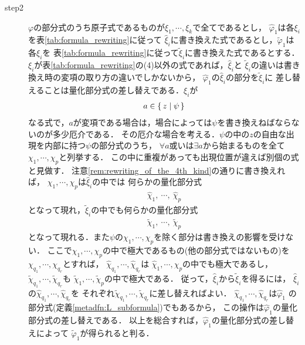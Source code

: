 \begin{sketch}
\begin{description}
			\item[step2]	
				$\varphi$の部分式のうち原子式であるものが$\xi_{1},\cdots,\xi_{k}$で全てであるとし，
				$\widehat{\varphi}_{1}$は各$\xi_{i}$を表\ref{tab:formula_rewriting}に従って
				$\widehat{\xi}_{i}$に書き換えた式であるとし，$\widetilde{\varphi}_{1}$は各$\xi_{i}$を
				表\ref{tab:formula_rewriting}に従って$\widetilde{\xi}_{i}$に書き換えた式であるとする．
				$\xi_{i}$が表\ref{tab:formula_rewriting}の(4)以外の式であれば，$\widehat{\xi}_{i}$と
				$\widetilde{\xi}_{i}$の違いは書き換え時の変項の取り方の違いでしかないから，
				$\widehat{\varphi}_{1}$の$\widehat{\xi}_{i}$の部分を$\widetilde{\xi}_{i}$に
				差し替えることは量化部分式の差し替えである．$\xi_{i}$が
				\begin{align}
					a \in \{\, z \mid \psi\, \}
				\end{align}
				なる式で，$a$が変項である場合は，場合によっては$\psi$を書き換えねばならないのが多少厄介である．
				その厄介な場合を考える．$\psi$の中の$z$の自由な出現を内部に持つ$\psi$の部分式のうち，
				$\forall a$或いは$\exists a$から始まるものを全て$\chi_{1},\cdots,\chi_{p}$と列挙する．
				この中に重複があっても出現位置が違えば別個の式と見做す．
				注意\ref{rem:rewriting_of_the_4th_kind}の通りに書き換えれば，
				$\chi_{1},\cdots,\chi_{p}$は$\widehat{\xi}_{i}$の中では
				何らかの量化部分式
				\begin{align}
					\widehat{\chi}_{1},\ \cdots,\ \widehat{\chi}_{p}
				\end{align}
				となって現れ，$\widetilde{\xi}_{i}$の中でも何らかの量化部分式
				\begin{align}
					\widetilde{\chi}_{1},\ \cdots,\ \widetilde{\chi}_{p}
				\end{align}
				となって現れる．また$\psi$の$\chi_{1},\cdots,\chi_{p}$を除く部分は書き換えの影響を受けない．
				ここで$\chi_{1},\cdots,\chi_{p}$の中で極大であるもの(他の部分式ではないもの)を
				$\chi_{q_{1}},\cdots,\chi_{q_{r}}$とすれば，
				$\widehat{\chi}_{q_{1}},\cdots,\widehat{\chi}_{q_{r}}$は
				$\widehat{\chi}_{1},\cdots,\widehat{\chi}_{p}$の中でも極大であるし，
				$\widetilde{\chi}_{q_{1}},\cdots,\widetilde{\chi}_{q_{r}}$も
				$\widetilde{\chi}_{1},\cdots,\widetilde{\chi}_{p}$の中で極大である．
				従って，$\widehat{\xi}_{i}$から$\widetilde{\xi}_{i}$を得るには，
				$\widehat{\xi}_{i}$の$\widehat{\chi}_{q_{1}},\cdots,\widehat{\chi}_{q_{r}}$を
				それぞれ$\widetilde{\chi}_{q_{1}},\cdots,\widetilde{\chi}_{q_{r}}$に差し替えればよい．
				$\widehat{\chi}_{q_{1}},\cdots,\widehat{\chi}_{q_{r}}$は$\widehat{\varphi}_{1}$
				の部分式(定義\ref{metadfn:L_subformula})でもあるから，
				この操作は$\widehat{\varphi}_{1}$の量化部分式の差し替えである．
				以上を総合すれば，$\widehat{\varphi}_{1}$の量化部分式の差し替えによって
				$\widetilde{\varphi}_{1}$が得られると判る．
				\QED
		\end{description}
	\end{sketch}
	
